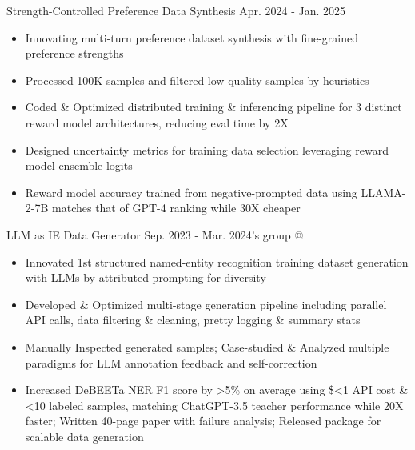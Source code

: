 \cveventSameLine{}
    {Strength-Controlled Preference Data Synthesis}
    {Apr. 2024 - Jan. 2025}{}
\begin{itemize}

    \item Innovating multi-turn preference dataset synthesis with fine-grained preference strengths

    \item Processed 100K samples and filtered low-quality samples by heuristics

    \item Coded \& Optimized distributed training \& inferencing pipeline for 3 distinct reward model architectures, reducing eval time by 2X

    \item Designed uncertainty metrics for training data selection leveraging reward model ensemble logits

    \item Reward model accuracy trained from negative-prompted data using LLAMA-2-7B matches that of GPT-4 ranking while 30X cheaper
\end{itemize}
\dividerSmall


\cveventSameLine{}
    {LLM as IE Data Generator}
    {Sep. 2023 - Mar. 2024}{'s group @ }
\begin{itemize}

    \item Innovated 1st structured named-entity recognition training dataset generation with LLMs by attributed prompting for diversity

    \item Developed \& Optimized multi-stage generation pipeline including parallel API calls, data filtering \& cleaning, pretty logging \& summary stats

    \item Manually Inspected generated samples; Case-studied \& Analyzed multiple paradigms for LLM annotation feedback and self-correction

    \item Increased DeBEETa NER F1 score by >5\% on average using \$<1 API cost \& <10 labeled samples,
    matching ChatGPT-3.5 teacher performance while 20X faster; Written 40-page paper with failure analysis; Released package for scalable data generation
\end{itemize}
\dividerSmall


